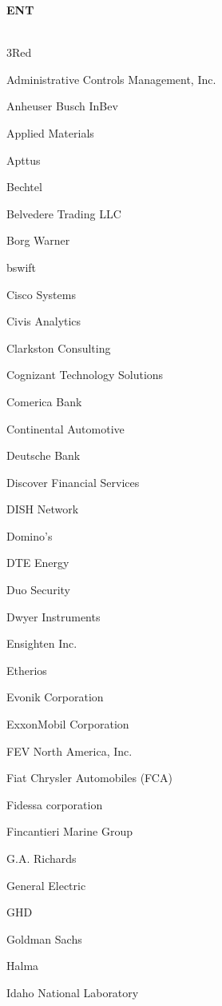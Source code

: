 \documentclass[twoside]{article}
\begin{document}
\begin{center}
\begin{multicols}{5}
        {\fontsize{14}{16}\selectfont \bf ENT}\\
        \vspace{-1em}
        ~\hrulefill~
        \vspace{-.9em}
        \begin{FlushLeft}
        \begin{compactitem}
        \item 3Red
\item Administrative Controls Management, Inc.
\item Anheuser Busch InBev
\item Applied Materials
\item Apttus
\item Bechtel
\item Belvedere Trading LLC
\item Borg Warner
\item bswift
\item Cisco Systems
\item Civis Analytics
\item Clarkston Consulting
\item Cognizant Technology Solutions
\item Comerica Bank
\item Continental Automotive
\item Deutsche Bank
\item Discover Financial Services
\item DISH Network
\item Domino's
\item DTE Energy
\item Duo Security
\item Dwyer Instruments
\item Ensighten Inc.
\item Etherios
\item Evonik Corporation
\item ExxonMobil Corporation
\item FEV North America, Inc.
\item Fiat Chrysler Automobiles (FCA)
\item Fidessa corporation
\item Fincantieri Marine Group
\item G.A. Richards
\item General Electric
\item GHD
\item Goldman Sachs
\item Halma
\item Idaho National Laboratory

\end{compactitem}
\end{FlushLeft}
\end{multicols}
\end{center}
\end{document}
